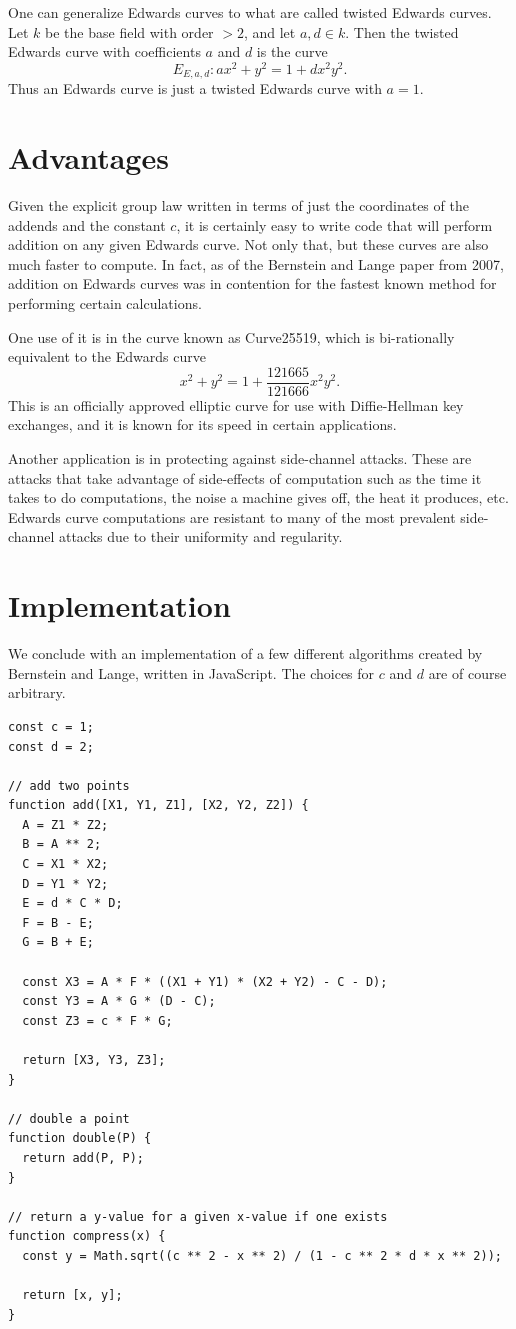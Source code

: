 \documentclass[12pt]{article}
\theoremstyle{definition}
\begin{document}
One can generalize Edwards curves to what are called twisted Edwards curves.
Let $k$ be the base field with order $> 2$, and let $a, d \in k$.
Then the twisted Edwards curve with coefficients $a$ and $d$ is the curve \begin{equation*}
	E_{E,a,d} : ax^2 + y^2 = 1+dx^2y^2.
\end{equation*}
Thus an Edwards curve is just a twisted Edwards curve with $a=1$.

\section{Advantages}
Given the explicit group law written in terms of just the coordinates of the addends and the constant $c$, it is certainly easy to write code that will perform addition on any given Edwards curve.
Not only that, but these curves are also much faster to compute.
In fact, as of the Bernstein and Lange paper from 2007, addition on Edwards curves was in contention for the fastest known method for performing certain calculations.

One use of it is in the curve known as Curve25519, which is bi-rationally equivalent to the Edwards curve \begin{equation*}
	x^2 + y^2 = 1 + \frac{121665}{121666}x^2y^2.
\end{equation*}
This is an officially approved elliptic curve for use with Diffie-Hellman key exchanges, and it is known for its speed in certain applications.

Another application is in protecting against side-channel attacks.
These are attacks that take advantage of side-effects of computation such as the time it takes to do computations, the noise a machine gives off, the heat it produces, etc.
Edwards curve computations are resistant to many of the most prevalent side-channel attacks due to their uniformity and regularity.

\section{Implementation}
We conclude with an implementation of a few different algorithms created by Bernstein and Lange, written in JavaScript.
The choices for $c$ and $d$ are of course arbitrary.
\begin{verbatim}
const c = 1;
const d = 2;

// add two points
function add([X1, Y1, Z1], [X2, Y2, Z2]) {
  A = Z1 * Z2;
  B = A ** 2;
  C = X1 * X2;
  D = Y1 * Y2;
  E = d * C * D;
  F = B - E;
  G = B + E;

  const X3 = A * F * ((X1 + Y1) * (X2 + Y2) - C - D);
  const Y3 = A * G * (D - C);
  const Z3 = c * F * G;

  return [X3, Y3, Z3];
}

// double a point
function double(P) {
  return add(P, P);
}

// return a y-value for a given x-value if one exists
function compress(x) {
  const y = Math.sqrt((c ** 2 - x ** 2) / (1 - c ** 2 * d * x ** 2));

  return [x, y];
}
\end{verbatim}
\end{document}
